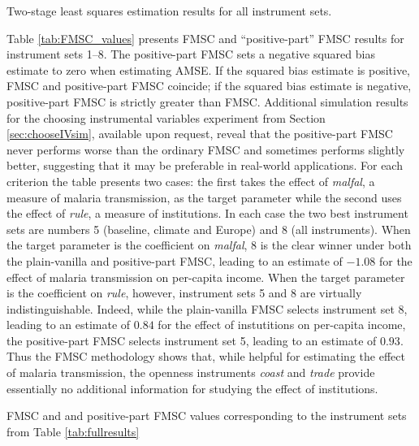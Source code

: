 \begin{table}[h]
\centering

\caption{Two-stage least squares estimation results for all instrument sets.}
\label{tab:fullresults}

\end{table}

Table \ref{tab:FMSC_values} presents FMSC and ``positive-part'' FMSC results for instrument sets 1--8.
The positive-part FMSC sets a negative squared bias estimate to zero when estimating AMSE.
If the squared bias estimate is positive, FMSC and positive-part FMSC coincide; if the squared bias estimate is negative, positive-part FMSC is strictly greater than FMSC. 
Additional simulation results for the choosing instrumental variables experiment from Section \ref{sec:chooseIVsim}, available upon request, reveal that the positive-part FMSC never performs worse than the ordinary FMSC and sometimes performs slightly better, suggesting that it may be preferable in real-world applications.
For each criterion the table presents two cases: the first takes the effect of \emph{malfal}, a measure of malaria transmission, as the target parameter while the second uses the effect of \emph{rule}, a measure of institutions. 
In each case the two best instrument sets are numbers 5 (baseline, climate and Europe) and 8 (all instruments).
When the target parameter is the coefficient on \emph{malfal}, 8 is the clear winner under both the plain-vanilla and positive-part FMSC, leading to an estimate of $-1.08$ for the effect of malaria transmission on per-capita income.
When the target parameter is the coefficient on \emph{rule}, however, instrument sets 5 and 8 are virtually indistinguishable.
Indeed, while the plain-vanilla FMSC selects instrument set 8, leading to an estimate of $0.84$ for the effect of instutitions on per-capita income, the positive-part FMSC selects instrument set 5, leading to an estimate of $0.93$. 
Thus the FMSC methodology shows that, while helpful for estimating the effect of malaria transmission, the openness instruments \emph{coast} and \emph{trade} provide essentially no additional information for studying the effect of institutions.

\begin{table}[htbp]
	\centering
	
		\caption{FMSC and and positive-part FMSC values corresponding to the instrument sets from Table \ref{tab:fullresults}}
		\label{tab:FMSC_values}
\end{table}

